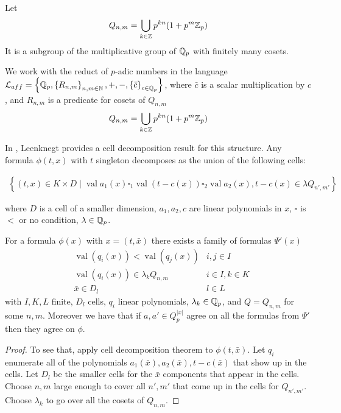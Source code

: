\documentclass{amsart}
\newcommand{\LLA}{\mathcal L_{aff}}
\newcommand{\curly}[1]{\left\{#1\right\}}
\newcommand{\paren}[1]{\left(#1\right)}
\DeclareMathOperator{\val}{val}
\begin{document}

\begin{Definition}
	Let
	\begin{align*}
		Q_{n,m} = \bigcup_{k \in \mathbb{Z}} p^{kn} (1 + p^m\mathbb{Z}_p) 
	\end{align*}
	It is a subgroup of the multiplicative group of $\mathbb{Q}_p$ with finitely many cosets.
\end{Definition}

We work with the reduct of $p$-adic numbers in the language $\LLA = \curly{\Q_p, \curly{R_{n,m}}_{n,m\in \N}, +, -, \curly{\bar c}_{c \in \Q_p} }$,
where $\bar c$ is a scalar multiplication by $c$, and $R_{n,m}$ is a predicate for cosets of $Q_{n,m}$
\begin{align*}
    Q_{n,m} = \bigcup_{k \in \mathbb{Z}} p^{kn} (1 + p^m\mathbb{Z}_p) 
\end{align*}


In \cite{reduct}, Leenknegt provides a cell decomposition result for this structure.
Any formula $\phi(t, x)$  with $t$  singleton decomposes as the union of the following cells:

\begin{align*}
	\curly{(t, x) \in K \times D \mid \val a_1(x) \square_1 \val (t - c(x)) \square_2 \val a_2(x), t - c(x) \in \lambda Q_{n',m'} }
\end{align*}

where $D$ is a cell of a smaller dimension, $a_1, a_2, c$ are linear polynomials in  $x$, $\square$ is $<$ or no condition, $\lambda  \in\mathbb{Q}_p$.

\begin{Lemma}
	For a formula $\phi(x)$ with $x = (t, \bar x)$ there exists a family of formulas $\Psi'(x)$
	\begin{align*}
		&\val \paren{q_i(x)} < \val \paren{q_j(x)} & i, j \in I \\
		&\val \paren{q_i(x)} \in \lambda_k Q_{n,m} & i \in I , k \in K \\
		&\bar x \in D_l & l \in L
	\end{align*}
	with $I, K, L$ finite,
	$D_l$ cells,
	$q_i$ linear polynomials,
	$\lambda_k \in \mathbb{Q}_p$, and
	$Q = Q_{n,m}$ for some $n,m$.
	Moreover we have that if $a, a' \in Q_p^{|x|}$ agree on all the formulas from $\Psi'$ then they agree on $\phi$.
\end{Lemma}

\begin{proof}
	To see that, apply cell decomposition theorem to $\phi(t, \bar x)$.
	Let $q_i$ enumerate all of the polynomials $a_1(\bar x), a_2(\bar x), t - c(\bar x)$ that show up in the cells.
	Let $D_l$ be the smaller cells for the $\bar x$ components that appear in the cells.
	Choose $n,m$ large enough to cover all $n', m'$ that come up in the cells for $Q_{n',m'}$.
	Choose $\lambda_k$ to go over all the cosets of $Q_{n,m}$.
\end{proof}
\end{document}
